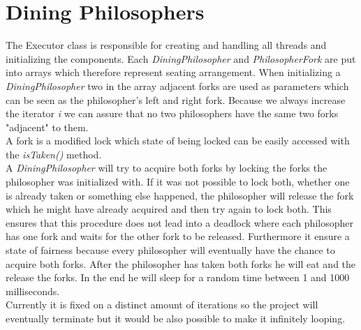 \documentclass{article}
\begin{document}
    \section{Dining Philosophers}
    \begin{adjustwidth}{2em}{2em}
    	The Executor class is responsible for creating and handling all threads and initializing the components. Each \textit{DiningPhilosopher} and \textit{PhilosopherFork} are put into arrays which therefore represent seating arrangement. When initializing a \textit{DiningPhilosopher} two in the array adjacent forks are used as parameters which can be seen as the philosopher's left and right fork. Because we always increase the iterator \textit{i} we can assure that no two philosophers have the same two forks "adjacent" to them. \\
    	A fork is a modified lock which state of being locked can be easily accessed with the \textit{isTaken()} method. \\
    	A \textit{DiningPhilosopher} will try to acquire both forks by locking the forks the philosopher was initialized with. If it was not possible to lock both, whether one is already taken or something else happened, the philosopher will release the fork which he might have already acquired and then try again to lock both. This ensures that this procedure does not lead into a deadlock where each philosopher has one fork and waits for the other fork to be released. Furthermore it ensure a state of fairness because every philosopher will eventually have the chance to acquire both forks. After the philosopher has taken both forks he will eat and the release the forks. In the end he will sleep for a random time between 1 and 1000 milliseconds. \\
    	Currently it is fixed on a distinct amount of iterations so the project will eventually terminate but it would be also possible to make it infinitely looping.
    \end{adjustwidth}
    
\end{document}
